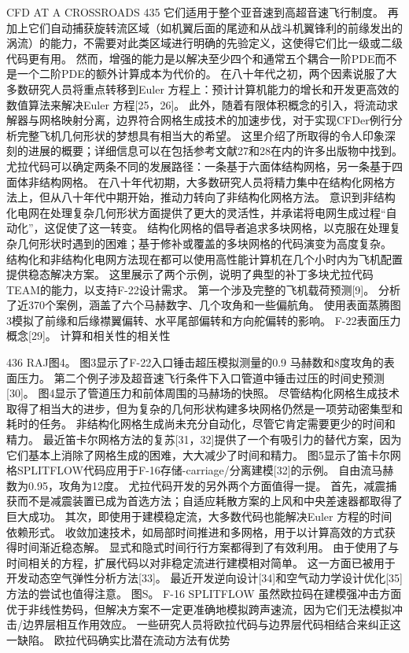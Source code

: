 \documentclass[UTF8,11pt,a4paper,openany,fontset=fandol]{ctexbook}
\begin{document}
CFD AT A CROSSROADS 435 它们适用于整个亚音速到高超音速飞行制度。 再加上它们自动捕获旋转流区域（如机翼后面的尾迹和从战斗机翼锋利的前缘发出的涡流）的能力，不需要对此类区域进行明确的先验定义，这使得它们比一级或二级代码更有用。 然而，增强的能力是以解决至少四个和通常五个耦合一阶PDE而不是一个二阶PDE的额外计算成本为代价的。 在八十年代之初，两个因素说服了大多数研究人员将重点转移到Euler 方程上：预计计算机能力的增长和开发更高效的数值算法来解决Euler 方程[25，26]。 此外，随着有限体积概念的引入，将流动求解器与网格映射分离，边界符合网格生成技术的加速步伐，对于实现CFDer例行分析完整飞机几何形状的梦想具有相当大的希望。 这里介绍了所取得的令人印象深刻的进展的概要；详细信息可以在包括参考文献27和28在内的许多出版物中找到。 尤拉代码可以确定两条不同的发展路径：一条基于六面体结构网格，另一条基于四面体非结构网格。 在八十年代初期，大多数研究人员将精力集中在结构化网格方法上，但从八十年代中期开始，推动力转向了非结构化网格方法。 意识到非结构化电网在处理复杂几何形状方面提供了更大的灵活性，并承诺将电网生成过程“自动化”，这促使了这一转变。 结构化网格的倡导者追求多块网格，以克服在处理复杂几何形状时遇到的困难；基于修补或覆盖的多块网格的代码演变为高度复杂。 结构化和非结构化电网方法现在都可以使用高性能计算机在几个小时内为飞机配置提供稳态解决方案。 这里展示了两个示例，说明了典型的补丁多块尤拉代码TEAM的能力，以支持F-22设计需求。 第一个涉及完整的飞机载荷预测[9]。 分析了近370个案例，涵盖了六个马赫数字、几个攻角和一些偏航角。 使用表面蒸腾图3模拟了前缘和后缘襟翼偏转、水平尾部偏转和方向舵偏转的影响。 F-22表面压力概念[29]。 计算和相关性的相关性

436 RAJ图4。 图3显示了F-22入口锤击超压模拟测量的0.9 马赫数和8度攻角的表面压力。 第二个例子涉及超音速飞行条件下入口管道中锤击过压的时间史预测[30]。 图4显示了管道压力和前体周围的马赫场的快照。 尽管结构化网格生成技术取得了相当大的进步，但为复杂的几何形状构建多块网格仍然是一项劳动密集型和耗时的任务。 非结构化网格生成尚未充分自动化，尽管它肯定需要更少的时间和精力。 最近笛卡尔网格方法的复苏[31，32]提供了一个有吸引力的替代方案，因为它们基本上消除了网格生成的困难，大大减少了时间和精力。 图5显示了笛卡尔网格SPLITFLOW代码应用于F-16存储-carriage/分离建模[32]的示例。 自由流马赫数为0.95，攻角为12度。 尤拉代码开发的另外两个方面值得一提。 首先，减震捕获而不是减震装置已成为首选方法；自适应耗散方案的上风和中央差速器都取得了巨大成功。 其次，即使用于建模稳定流，大多数代码也能解决Euler 方程的时间依赖形式。 收敛加速技术，如局部时间推进和多网格，用于以计算高效的方式获得时间渐近稳态解。 显式和隐式时间行行方案都得到了有效利用。 由于使用了与时间相关的方程，扩展代码以对非稳定流进行建模相对简单。 这一方面已被用于开发动态空气弹性分析方法[33]。 最近开发逆向设计[34]和空气动力学设计优化[35]方法的尝试也值得注意。 图S。 F-16 SPLITFLOW 虽然欧拉码在建模强冲击方面优于非线性势码，但解决方案不一定更准确地模拟跨声速流，因为它们无法模拟冲击/边界层相互作用效应。 一些研究人员将欧拉代码与边界层代码相结合来纠正这一缺陷。 欧拉代码确实比潜在流动方法有优势
\end{document}
